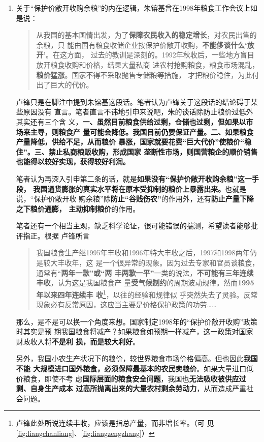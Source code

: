\begin{enumerate}
\item 关于“保护价敞开收购余粮”的内在逻辑，朱镕基曾在1998年粮食工作会议上如是说：
  \begin{quotation}
    从我国的基本国情出发，为了\textbf{保障农民收入的稳定增长}，对农民出售的余粮，只
    能由国有粮食收储企业按保护价敞开收购，\textbf{不能侈谈什么‘放开’}。在这方面，
    过去的教训是深刻的。1992年秋收后，一些地方盲目放开粮食收购和价格，结果大量私商
    进农村抢购粮食，粮食市场混乱，\textbf{粮价猛涨}。国家不得不采取抛售专储粮等措施，
    才把粮价稳住，为此付出了巨大的代价。\cite{zhuchangkai}
  \end{quotation}

  卢锋只是在脚注中提到朱镕基这段话。笔者认为卢锋关于这段话的结论碍于某些原因没有
  直言。笔者直言不讳地引申来说吧，朱的谈话除防止粮价过低外其实还有三个含
  义，\textbf{一、虽然目前粮食供给过剩，仓储也过剩，但如果以市场来主导，则粮食产
    量可能会降低。我国目前仍要保证产量。二、如果粮食产量降低，供给不足，从而粮价
    暴涨，国家就要花费“巨大代价”使粮价“稳住”。三、禁止私商粮贩收购，形成国家
    垄断性市场，则国营粮企的顺价销售也能得以较好实现，获得较好利润。}

  笔者认为再深入引申第二条的话，就是\textbf{如果没有“保护价敞开收购余粮”这一手段，
    我国通货膨胀的真实水平将在原本受抑制的粮价上暴露出来。}也就是说，“保护价敞开收
  购余粮”除\textbf{防止“谷贱伤农”}的作用外，还有\textbf{防止产量下降之下粮价通膨，
    主动抑制粮价}的作用。

  笔者还有一个相当主观，缺乏科学论证，很可能错误的揣测，希望读者能够批评指正。根据
  卢锋所言
  \begin{quotation}
    我国粮食生产继1995年丰收和1996年特大丰收之后，1997和1998两年仍是较大丰收年，这
    是一个很异常的现象。因为过去专家和官员谈粮食，通常有“\textbf{两年一歉”或“两
      丰两歉一平”}一类的说法，\textbf{不可能有三年连续丰收}，认为这是我国粮食产
    量\textbf{受气候制约}的周期波动规律。然而\textbf{1995年以来四年连续丰
      收}\footnote{卢锋此处所说连续丰收，应该是指总产量，而非增长率。（可
      见\cref{fig:liangchanliang}、\cref{fig:liangzengzhang}）}，以往的经验和规律似
    乎突然失去了灵验。反常现象必有反常原因，这应当主要是价格保护政策的功劳……
  \end{quotation}
  那么，是不是可以换一个角度来想。国家制定1998年的“保护价敞开收购”政策时其实是预
  期我国粮食将减产？如果粮食如预期一样减产，这一政策对国家财政收入将\textbf{不是利
    损，而是较大利好}。

  另外，我国小农生产状况下的粮价，较世界粮食市场价格偏高。但也因此\textbf{我国不能
    大规模进口国外粮食，必须保障最基本的农民卖粮价}。如果大量进口低价粮食，即使不考
  虑\textbf{国际层面的粮食安全问题}，我国也\textbf{无法吸收被供应过剩、自身生产成本
    过高所抛离出来的大量农村剩余劳动力}，从而造成严重社会问题。


\end{enumerate}
